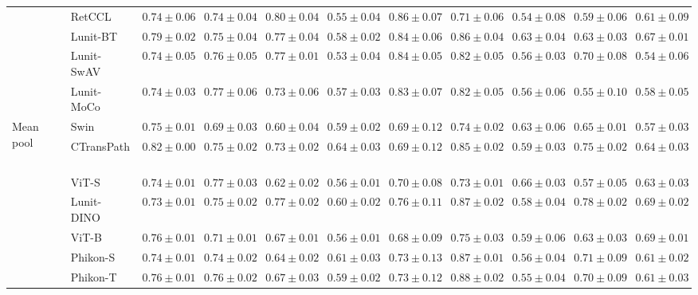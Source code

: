 \begin{tabular}{ll|cccc|c|cccc}
 & RetCCL~\cite{wang2023retccl} & $0.74 \pm 0.06$ & $0.74 \pm 0.04$ & $\mathbf{0.80 \pm 0.04}$ & $0.55 \pm 0.04$ & $0.86 \pm 0.07$ & $0.71 \pm 0.06$ & $0.54 \pm 0.08$ & $0.59 \pm 0.06$ & $0.61 \pm 0.09$ \\
 & Lunit-BT~\cite{kang2023benchmarking} & $0.79 \pm 0.02$ & $0.75 \pm 0.04$ & $0.77 \pm 0.04$ & $0.58 \pm 0.02$ & $0.84 \pm 0.06$ & $0.86 \pm 0.04$ & $\mathbf{0.63 \pm 0.04}$ & $0.63 \pm 0.03$ & $0.67 \pm 0.01$ \\
 & Lunit-SwAV~\cite{kang2023benchmarking} & $0.74 \pm 0.05$ & $0.76 \pm 0.05$ & $0.77 \pm 0.01$ & $0.53 \pm 0.04$ & $0.84 \pm 0.05$ & $0.82 \pm 0.05$ & $0.56 \pm 0.03$ & $0.70 \pm 0.08$ & $0.54 \pm 0.06$ \\
 & Lunit-MoCo~\cite{kang2023benchmarking} & $0.74 \pm 0.03$ & $0.77 \pm 0.06$ & $0.73 \pm 0.06$ & $0.57 \pm 0.03$ & $0.83 \pm 0.07$ & $0.82 \pm 0.05$ & $0.56 \pm 0.06$ & $0.55 \pm 0.10$ & $0.58 \pm 0.05$ \\
\cline{1-11}
\multirow[t]{12}{*}{Mean pool} & Swin~\cite{liu2021swin} & $0.75 \pm 0.01$ & $0.69 \pm 0.03$ & $0.60 \pm 0.04$ & $0.59 \pm 0.02$ & $0.69 \pm 0.12$ & $0.74 \pm 0.02$ & $0.63 \pm 0.06$ & $0.65 \pm 0.01$ & $0.57 \pm 0.03$ \\
 & CTransPath~\cite{wang2022transformer} & $\mathbf{0.82 \pm 0.00}$ & $0.75 \pm 0.02$ & $0.73 \pm 0.02$ & $\mathbf{0.64 \pm 0.03}$ & $0.69 \pm 0.12$ & $0.85 \pm 0.02$ & $0.59 \pm 0.03$ & $0.75 \pm 0.02$ & $0.64 \pm 0.03$ \\
 & ViT-S~\cite{kolesnikov2021image} & $0.74 \pm 0.01$ & $0.77 \pm 0.03$ & $0.62 \pm 0.02$ & $0.56 \pm 0.01$ & $0.70 \pm 0.08$ & $0.73 \pm 0.01$ & $\mathbf{0.66 \pm 0.03}$ & $0.57 \pm 0.05$ & $0.63 \pm 0.03$ \\
 & Lunit-DINO~\cite{kang2023benchmarking} & $0.73 \pm 0.01$ & $0.75 \pm 0.02$ & $\mathbf{0.77 \pm 0.02}$ & $0.60 \pm 0.02$ & $\mathbf{0.76 \pm 0.11}$ & $0.87 \pm 0.02$ & $0.58 \pm 0.04$ & $\mathbf{0.78 \pm 0.02}$ & $0.69 \pm 0.02$ \\
 & ViT-B~\cite{kolesnikov2021image} & $0.76 \pm 0.01$ & $0.71 \pm 0.01$ & $0.67 \pm 0.01$ & $0.56 \pm 0.01$ & $0.68 \pm 0.09$ & $0.75 \pm 0.03$ & $0.59 \pm 0.06$ & $0.63 \pm 0.03$ & $\mathbf{0.69 \pm 0.01}$ \\
 & Phikon-S~\cite{filiot2023scaling} & $0.74 \pm 0.01$ & $0.74 \pm 0.02$ & $0.64 \pm 0.02$ & $0.61 \pm 0.03$ & $0.73 \pm 0.13$ & $0.87 \pm 0.01$ & $0.56 \pm 0.04$ & $0.71 \pm 0.09$ & $0.61 \pm 0.02$ \\
 & Phikon-T~\cite{filiot2023scaling} & $0.76 \pm 0.01$ & $0.76 \pm 0.02$ & $0.67 \pm 0.03$ & $0.59 \pm 0.02$ & $0.73 \pm 0.12$ & $\mathbf{0.88 \pm 0.02}$ & $0.55 \pm 0.04$ & $0.70 \pm 0.09$ & $0.61 \pm 0.03$ \\

\end{tabular}
